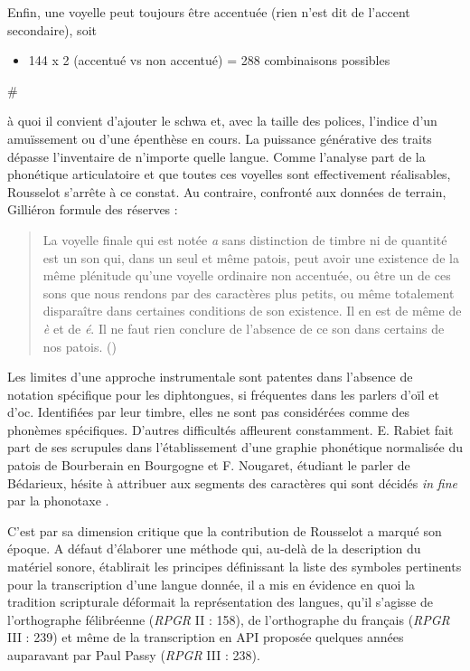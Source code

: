 \documentclass[output=paper]{langsci/langscibook}
\begin{document}
Enfin, une voyelle peut toujours être accentuée (rien n’est dit de l’accent secondaire), soit

\begin{itemize}
      \item [] 144 x 2 (accentué vs non accentué) = 288 combinaisons possibles 
\end{itemize}#

à quoi il convient d’ajouter le schwa et, avec la taille des polices, l’indice d’un amuïssement ou d’une épenthèse en cours. La puissance générative des traits dépasse l’inventaire de n’importe quelle langue. Comme l’analyse part de la phonétique articulatoire et que toutes ces voyelles sont effectivement réalisables, Rousselot s’arrête à ce constat. Au contraire, confronté aux données de terrain, Gilliéron formule des réserves :

\begin{quote}
    La voyelle finale qui est notée \textit{a} sans distinction de timbre ni de quantité est un son qui, dans un seul et même patois, peut avoir une existence de la même plénitude qu’une voyelle ordinaire non accentuée, ou être un de ces sons que nous rendons par des caractères plus petits, ou même totalement disparaître dans certaines conditions de son existence. Il en est de même de \textit{è} et de \textit{é}. Il ne faut rien conclure de l’absence de ce son dans certains de nos patois. (\citealt[33-34n]{gillieron_melanges_1888})
\end{quote}

Les limites d’une approche instrumentale sont patentes dans l’absence de notation spécifique pour les diphtongues, si fréquentes dans les parlers d’oïl et d’oc. Identifiées par leur timbre, elles ne sont pas considérées comme des phonèmes spécifiques. D’autres difficultés affleurent constamment. E. Rabiet fait part de ses scrupules dans l’établissement d’une graphie phonétique normalisée du patois de Bourberain en Bourgogne \citeyear[243]{rabiet_patois_1887} et F. Nougaret, étudiant le parler de Bédarieux, hésite à attribuer aux segments des caractères qui sont décidés \textit{in} \textit{fine} par la phonotaxe \citeyear[216]{nougaret_patois_1890}.

C’est par sa dimension critique que la contribution de Rousselot a marqué son époque. A défaut d’élaborer une méthode qui, au-delà de la description du matériel sonore, établirait les principes définissant la liste des symboles pertinents pour la transcription d’une langue donnée, il a mis en évidence en quoi la tradition scripturale déformait la représentation des langues, qu’il s’agisse de l’orthographe félibréenne (\textit{RPGR} II : 158), de l’orthographe du français (\textit{RPGR} III : 239) et même de la transcription en API proposée quelques années auparavant par Paul Passy (\textit{RPGR} III : 238).
\end{document}

